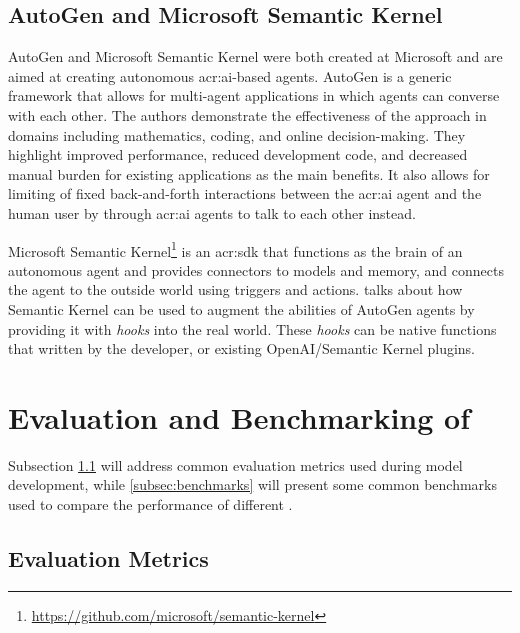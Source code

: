 \subsection{AutoGen and Microsoft Semantic Kernel}\label{subsubsec:microsoft-semantic-kernel}

AutoGen and Microsoft Semantic Kernel were both created at Microsoft and are aimed at creating autonomous \acrshort{acr:ai}-based agents. AutoGen \citep{wuAutoGenEnablingNextGen2023} is a generic framework that allows for multi-agent applications in which agents can converse with each other. The authors demonstrate the effectiveness of the approach in domains including mathematics, coding, and online decision-making. They highlight improved performance, reduced development code, and decreased manual burden for existing applications as the main benefits. It also allows for limiting of fixed back-and-forth interactions between the \acrshort{acr:ai} agent and the human user by through \acrshort{acr:ai} agents to talk to each other instead.

Microsoft Semantic Kernel\footnote{\url{https://github.com/microsoft/semantic-kernel}} is an \acrshort{acr:sdk} that functions as the brain of an autonomous agent and provides connectors to models and memory, and connects the agent to the outside world using triggers and actions. \cite{maedaAutoGenAgentsMeet2023} talks about how Semantic Kernel can be used to augment the abilities of AutoGen agents by providing it with \textit{hooks} into the real world. These \textit{hooks} can be native functions that written by the developer, or existing OpenAI/Semantic Kernel plugins.



\section[Evaluation and Benchmarking of LLMs]{Evaluation and Benchmarking of }\label{sec:benchmarking-and-evaluation}

Subsection \ref{subsec:evaluation-metrics} will address common evaluation metrics used during model development, while \autoref{subsec:benchmarks} will present some common benchmarks used to compare the performance of different .

\subsection{Evaluation Metrics}\label{subsec:evaluation-metrics}

